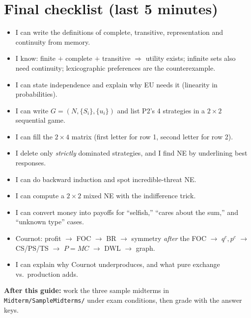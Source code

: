 \documentclass[11pt]{article}
\begin{document}
\section{Final checklist (last 5 minutes)}
\begin{itemize}
\item[$\square$] I can write the definitions of complete, transitive, representation and continuity from memory.
\item[$\square$] I know: finite $+$ complete $+$ transitive $\Rightarrow$ utility exists; infinite sets also need continuity; lexicographic preferences are the counterexample.
\item[$\square$] I can state independence and explain why EU needs it (linearity in probabilities).
\item[$\square$] I can write $G=(N,\{S_i\},\{u_i\})$ and list P2's 4 strategies in a $2\times2$ sequential game.
\item[$\square$] I can fill the $2\times4$ matrix (first letter for row 1, second letter for row 2).
\item[$\square$] I delete only \emph{strictly} dominated strategies, and I find NE by underlining best responses.
\item[$\square$] I can do backward induction and spot incredible-threat NE.
\item[$\square$] I can compute a $2\times2$ mixed NE with the indifference trick.
\item[$\square$] I can convert money into payoffs for ``selfish,'' ``cares about the sum,'' and ``unknown type'' cases.
\item[$\square$] Cournot: profit $\to$ FOC $\to$ BR $\to$ symmetry \emph{after} the FOC $\to$ $q^c,p^c$ $\to$ CS/PS/TS $\to$ $P=MC$ $\to$ DWL $\to$ graph.
\item[$\square$] I can explain why Cournot underproduces, and what pure exchange vs.\ production adds.
\end{itemize}

\vspace{6pt}
\textbf{After this guide:} work the three sample midterms in \texttt{Midterm/SampleMidterms/} under exam conditions, then grade with the answer keys.
\end{document}
